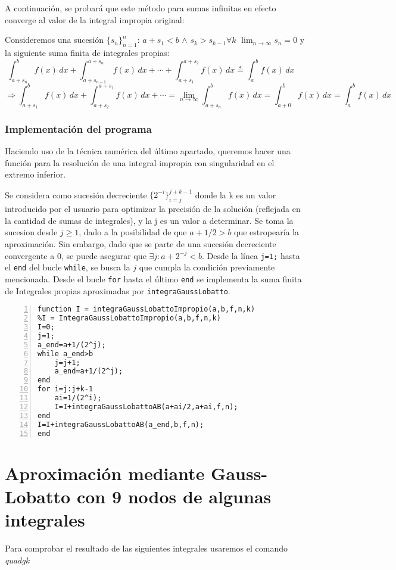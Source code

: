 \documentclass[a4paper]{article}
\begin{document}
A continuación, se probará que este método para sumas infinitas en efecto converge al valor de la integral impropia original:

Consideremos una sucesión $\{s_n\}_{n=1}^n$: $a+s_1<b$ $\wedge$ \stackrel{*} $s_k > s_{k-1} \forall k$ \wedge $\lim_{n \rightarrow \infty} s_n = 0$
y la siguiente suma finita de integrales propias:
$$
\int_{a + s_n}^b f(x) \, dx + \int_{a + s_{n-1}}^{a + s_n} f(x) \, dx + \cdots + \int_{a + s_1}^{a + s_2} f(x) \, dx \stackrel{*}= \int_a^b f(x) \, dx \quad $$
$$\Rightarrow \int_{a + s_1}^b f(x) \, dx + \int_{a + s_2}^{a + s_1} f(x) \, dx + \cdots = \lim_{n \rightarrow \infty} \int_{a + s_n}^b f(x) \, dx = \int_{a + 0}^b f(x) \, dx = \int_a^b f(x) \, dx$$

\subsubsection{Implementación del programa}

Haciendo uso de la técnica numérica del último apartado, queremos hacer una función para la resolución de una integral impropia con singularidad en el extremo inferior.

Se considera como sucesión decreciente $\{2^{-i}\}_{i=j}^{j+k-1}$ donde la k es un valor introducido por el usuario para optimizar la precisión de la solución (reflejada en la cantidad de sumas de integrales), y la j es un valor a determinar. Se toma la sucesion desde $j\geq 1$, dado a la posibilidad de que $a+1/2>b$ que estropearía la aproximación. Sin embargo, dado que se parte de una sucesión decreciente convergente a 0, se puede asegurar que $\exists j:a+2^{-j}<b$. Desde la línea \texttt{j=1;} hasta el \texttt{end} del bucle \texttt{while}, se busca la $j$ que cumpla la condición previamente mencionada. Desde el bucle \texttt{for} hasta el último \texttt{end} se implementa la suma finita de Integrales propias aproximadas por \texttt{integraGaussLobatto}.

 
\begin{lstlisting}[frame=single, numbers=left, style=Matlab-Pyglike]
function I = integraGaussLobattoImpropio(a,b,f,n,k)
%I = IntegraGaussLobattoImpropio(a,b,f,n,k)
I=0;
j=1;
a_end=a+1/(2^j);
while a_end>b
    j=j+1;
    a_end=a+1/(2^j);
end
for i=j:j+k-1
    ai=1/(2^i);
    I=I+integraGaussLobattoAB(a+ai/2,a+ai,f,n);
end
I=I+integraGaussLobattoAB(a_end,b,f,n);
end
\end{lstlisting}

\section{Aproximación mediante Gauss-Lobatto con 9 nodos de algunas integrales}
Para comprobar el resultado de las siguientes integrales usaremos el comando \textit{quadgk}
\end{document}
